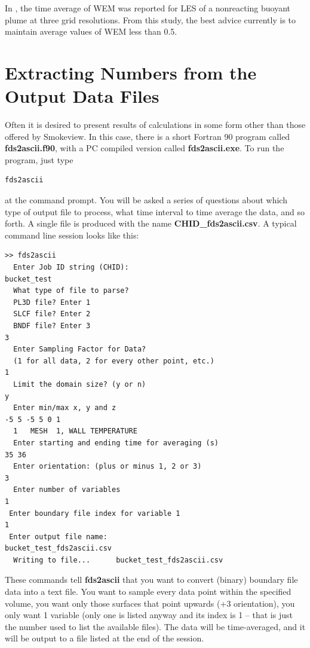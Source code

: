 \documentclass[11pt]{book}
\begin{document}
In \cite{McDermott:2010}, the time average of WEM was reported for LES of a nonreacting buoyant plume at three grid resolutions.  From this study, the best advice currently is to maintain average values of WEM less than 0.5.



\clearpage


\section{Extracting Numbers from the Output Data Files}
\label{info:fds2ascii}

Often it is desired to present results of calculations in some form other
than those offered by Smokeview. In this case, there is a short
Fortran 90 program called {\bf fds2ascii.f90}, with a PC compiled version
called {\bf fds2ascii.exe}. To run the program, just type
\begin{verbatim}
fds2ascii
\end{verbatim}
at the command prompt. You will be asked a series of questions
about which type of output file to process, what time interval to
time average the data, and so forth. A single file is produced
with the name {\bf CHID\_fds2ascii.csv}. A typical command line session looks like this:

\footnotesize
\begin{verbatim}
>> fds2ascii
  Enter Job ID string (CHID):
bucket_test
  What type of file to parse?
  PL3D file? Enter 1
  SLCF file? Enter 2
  BNDF file? Enter 3
3
  Enter Sampling Factor for Data?
  (1 for all data, 2 for every other point, etc.)
1
  Limit the domain size? (y or n)
y
  Enter min/max x, y and z
-5 5 -5 5 0 1
  1   MESH  1, WALL TEMPERATURE
  Enter starting and ending time for averaging (s)
35 36
  Enter orientation: (plus or minus 1, 2 or 3)
3
  Enter number of variables
1
 Enter boundary file index for variable 1
1
 Enter output file name:
bucket_test_fds2ascii.csv
  Writing to file...      bucket_test_fds2ascii.csv
\end{verbatim}

\normalsize \noindent
These commands tell {\bf fds2ascii} that you want to convert (binary)
boundary file data into a text file. You want to sample
every data point within the specified volume, you want only those surfaces that point
upwards (+3 orientation), you only want 1 variable (only one is listed anyway and its index is
1 -- that is just the number used to list the available files). The data will be time-averaged, and it will
be output to a file listed at the end of the session.
\end{document}
